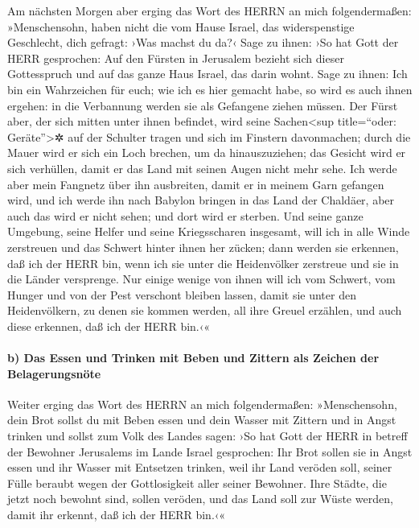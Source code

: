 Am nächsten Morgen aber erging das Wort des HERRN an mich
folgendermaßen: »Menschensohn, haben nicht die vom Hause
Israel, das widerspenstige Geschlecht, dich gefragt: ›Was machst du da?‹
Sage zu ihnen: ›So hat Gott der HERR gesprochen: Auf den
Fürsten in Jerusalem bezieht sich dieser Gottesspruch und auf das ganze
Haus Israel, das darin wohnt. Sage zu ihnen: Ich bin ein
Wahrzeichen für euch; wie ich es hier gemacht habe, so wird es auch
ihnen ergehen: in die Verbannung werden sie als Gefangene ziehen müssen.
Der Fürst aber, der sich mitten unter ihnen befindet,
wird seine Sachen\textless sup title=``oder: Geräte''\textgreater✲ auf
der Schulter tragen und sich im Finstern davonmachen; durch die Mauer
wird er sich ein Loch brechen, um da hinauszuziehen; das Gesicht wird er
sich verhüllen, damit er das Land mit seinen Augen nicht mehr sehe.
Ich werde aber mein Fangnetz über ihn ausbreiten, damit
er in meinem Garn gefangen wird, und ich werde ihn nach Babylon bringen
in das Land der Chaldäer, aber auch das wird er nicht sehen; und dort
wird er sterben. Und seine ganze Umgebung, seine Helfer
und seine Kriegsscharen insgesamt, will ich in alle Winde zerstreuen und
das Schwert hinter ihnen her zücken; dann werden sie
erkennen, daß ich der HERR bin, wenn ich sie unter die Heidenvölker
zerstreue und sie in die Länder versprenge. Nur einige
wenige von ihnen will ich vom Schwert, vom Hunger und von der Pest
verschont bleiben lassen, damit sie unter den Heidenvölkern, zu denen
sie kommen werden, all ihre Greuel erzählen, und auch diese erkennen,
daß ich der HERR bin.‹«

\hypertarget{b-das-essen-und-trinken-mit-beben-und-zittern-als-zeichen-der-belagerungsnuxf6te}{%
\paragraph{b) Das Essen und Trinken mit Beben und Zittern als Zeichen
der
Belagerungsnöte}\label{b-das-essen-und-trinken-mit-beben-und-zittern-als-zeichen-der-belagerungsnuxf6te}}

Weiter erging das Wort des HERRN an mich folgendermaßen:
»Menschensohn, dein Brot sollst du mit Beben essen und
dein Wasser mit Zittern und in Angst trinken und sollst
zum Volk des Landes sagen: ›So hat Gott der HERR in betreff der Bewohner
Jerusalems im Lande Israel gesprochen: Ihr Brot sollen sie in Angst
essen und ihr Wasser mit Entsetzen trinken, weil ihr Land veröden soll,
seiner Fülle beraubt wegen der Gottlosigkeit aller seiner Bewohner.
Ihre Städte, die jetzt noch bewohnt sind, sollen veröden,
und das Land soll zur Wüste werden, damit ihr erkennt, daß ich der HERR
bin.‹«

